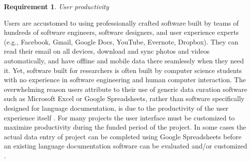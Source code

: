 \documentclass[11pt]{article}
\newtheorem{requirement}{Requirement}
\begin{document}

\begin{requirement}
	\label{req:productivity}
       User productivity
\end{requirement}


Users  are accustomed to using professionally crafted
software built by teams of hundreds of software engineers, software designers, and user experience experts
(e.g., Facebook, Gmail, Google Docs, YouTube, Evernote, Dropbox). They can read
their email on all devices, download and sync photos and videos
automatically, and have offline and mobile data there seamlessly when they need it.
Yet, software built for researchers is often built by computer science students with no experience in software engineering and human computer interaction.
The overwhelming reason users attribute to their use of generic data curation software such as Microsoft Excel or Google Spreadsheets, rather than software specifically designed for language documentation, is due to the productivity of the user experience itself  \cite{lingsync:2012}. 
For many projects the user interface must be customized to maximize productivity during the funded period of the project. In some cases the actual data entry of project can be completed using Google Spreadsheets before an existing language documentation software can be evaluated and/or customized \cite{Troy:2014}. 
\end{document}
